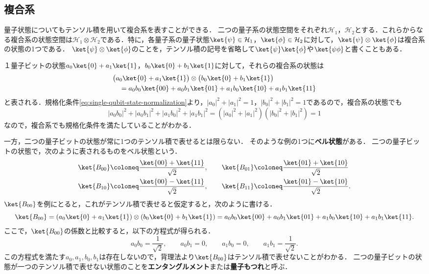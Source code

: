 \subsection{複合系}

量子状態についてもテンソル積を用いて複合系を表すことができる．
二つの量子系の状態空間をそれぞれ$\mathcal H_1$，$\mathcal H_2$とする．これらからなる複合系の状態空間は$\mathcal H_1\otimes\mathcal H_2$である．特に，各量子系の量子状態$\ket{\psi}\in\mathcal H_1$，$\ket{\phi}\in\mathcal H_2$に対して，$\ket{\psi}\otimes\ket{\phi}$は複合系の状態の1つである．
$\ket{\psi}\otimes\ket{\phi}$のことを，テンソル積の記号を省略して$\ket{\psi}\ket{\phi}$や$\ket{\psi\phi}$と書くこともある．

１量子ビットの状態$a_0\ket{0}+a_1\ket{1}$，$b_0\ket{0}+b_1\ket{1}$に対して，それらの複合系の状態は
\begin{align*}
   & \big(a_0\ket{0}+a_1\ket{1}\big)\otimes\big(b_0\ket{0}+b_1\ket{1}\big) \\
   & \quad = a_0b_0\ket{00}+a_0b_1\ket{01}+a_1b_0\ket{10}+a_1b_1\ket{11}
\end{align*}
と表される．規格化条件\eqref{eq:single-qubit-state-normalization}より，$|a_0|^2+|a_1|^2=1$，$|b_0|^2+|b_1|^2=1$であるので，複合系の状態でも
\[
  |a_0b_0|^2+|a_0b_1|^2+|a_1b_0|^2+|a_1b_1|^2
  =(|a_0|^2+|a_1|^2)(|b_0|^2+|b_1|^2)=1
\]
なので，複合系でも規格化条件を満たしていることがわかる．

一方，二つの量子ビットの状態が常に1つのテンソル積で表せるとは限らない．
そのような例の1つに\textbf{ベル状態}がある．
二つの量子ビットの状態で，次のように表されるものをベル状態という．
\begin{equation*}
  \begin{aligned}
     & \ket{B_{00}}\coloneq\frac{\ket{00}+\ket{11}}{\sqrt{2}}, \qquad
    \ket{B_{01}}\coloneq\frac{\ket{01}+\ket{10}}{\sqrt{2}}            \\
     & \ket{B_{10}}\coloneq\frac{\ket{00}-\ket{11}}{\sqrt{2}}, \qquad
    \ket{B_{11}}\coloneq\frac{\ket{01}-\ket{10}}{\sqrt{2}}.
  \end{aligned}
\end{equation*}
$\ket{B_{00}}$を例にとると，これがテンソル積で表せると仮定すると，次のように書ける．
\[
  \ket{B_{00}}=(a_0\ket{0}+a_1\ket{1})\otimes(b_0\ket{0}+b_1\ket{1})
  =a_0b_0\ket{00}+a_0b_1\ket{01}+a_1b_0\ket{10}+a_1b_1\ket{11}.
\]
ここで，$\ket{B_{00}}$の係数と比較すると，以下の方程式が得られる．
\[
  a_0b_0=\frac{1}{\sqrt2},\qquad
  a_0b_1=0,\qquad
  a_1b_0=0,\qquad
  a_1b_1=\frac{1}{\sqrt2}.
\]
この方程式を満たす$a_0,a_1,b_0,b_1$は存在しないので，背理法より$\ket{B_{00}}$はテンソル積で表せないことがわかる．
二つの量子ビットの状態が一つのテンソル積で表せない状態のことを\textbf{エンタングルメント}または\textbf{量子もつれ}と呼ぶ．

